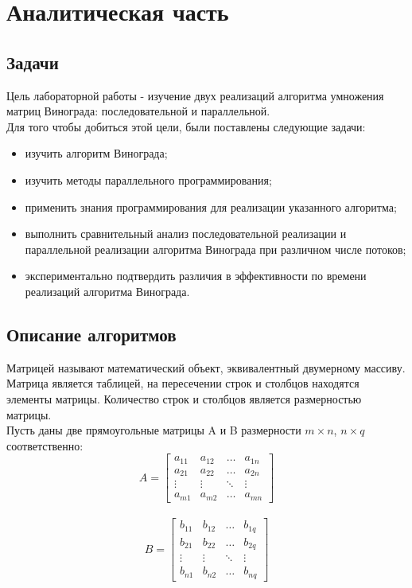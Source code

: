 \documentclass[12pt, a4paper]{report}
\begin{document}
    \chapter{Аналитическая часть}
	\section{Задачи}
	Цель лабораторной работы - изучение двух реализаций алгоритма умножения матриц Винограда: последовательной и параллельной.\\
	Для того чтобы добиться этой цели, были поставлены следующие задачи:
	\begin{itemize}
		\item изучить алгоритм Винограда;
		\item изучить методы параллельного программирования;
		\item применить знания программирования для реализации указанного алгоритма;
		\item выполнить сравнительный анализ последовательной реализации и параллельной реализации алгоритма Винограда при различном числе потоков;
		\item экспериментально подтвердить различия в эффективности по времени реализаций алгоритма Винограда.
	\end{itemize}

	\section{Описание алгоритмов}
	
	Матрицей называют математический объект, эквивалентный двумерному массиву. Матрица является таблицей, на пересечении строк и столбцов находятся элементы матрицы. Количество строк и столбцов является размерностью матрицы.\\
	Пусть даны две прямоугольные матрицы A и B размерности $m \times n$, $n \times q$
	соответственно:\\
	$$A =  \begin{bmatrix} 
	a_{11}& a_{12} &\ldots & a_{1n}\\ 
	a_{21}& a_{22} &\ldots & a_{2n}\\ 
	\vdots& \vdots &\ddots & \vdots\\ 
	a_{m1}& a_{m2} &\ldots & a_{mn} 
	\end{bmatrix} $$\\	
	
	$$B = \begin{bmatrix} 
	b_{11}& b_{12} &\ldots & b_{1q}\\ 
	b_{21}& b_{22} &\ldots & b_{2q}\\ 
	\vdots& \vdots &\ddots & \vdots\\ 
	b_{n1}& b_{n2} &\ldots & b_{nq} 
	\end{bmatrix} $$\\
	
\end{document}
